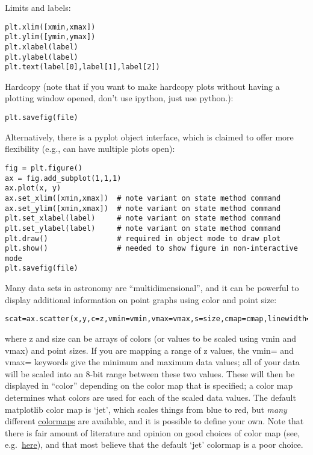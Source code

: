 \documentclass{article}
\begin{document}
Limits and labels:
\begin{verbatim}
plt.xlim([xmin,xmax])
plt.ylim([ymin,ymax])
plt.xlabel(label)
plt.ylabel(label)
plt.text(label[0],label[1],label[2])
\end{verbatim}

Hardcopy (note that if you want to make hardcopy plots without having
a plotting window opened, don't use ipython, just use python.):
\begin{verbatim}
plt.savefig(file)
\end{verbatim}
Alternatively, there is a pyplot object interface, which is claimed to
offer more flexibility (e.g., can have multiple plots open):
\begin{verbatim}
fig = plt.figure()
ax = fig.add_subplot(1,1,1)
ax.plot(x, y)
ax.set_xlim([xmin,xmax])  # note variant on state method command
ax.set_ylim([xmin,xmax])  # note variant on state method command
plt.set_xlabel(label)     # note variant on state method command
plt.set_ylabel(label)     # note variant on state method command
plt.draw()                # required in object mode to draw plot
plt.show()                # needed to show figure in non-interactive
mode
plt.savefig(file)
\end{verbatim}
Many data sets in astronomy are ``multidimensional'', and it can be
powerful to display additional information on point graphs using color
and point size:
\begin{verbatim}
scat=ax.scatter(x,y,c=z,vmin=vmin,vmax=vmax,s=size,cmap=cmap,linewidth=linewidth)
\end{verbatim}
where z and size can be arrays of colors (or values to be scaled using
vmin and vmax) and point sizes. If you are mapping a range of z
values, the vmin= and vmax= keywords give the minimum and maximum data
values; all of your data will be scaled into an 8-bit range between
these two values. These will then be displayed in ``color'' depending
on the color map that is specified; a color map determines what colors
are used for each of the scaled data values. The default matplotlib
color map is `jet', which scales things from blue to red, but
\emph{many} different \href{http://matplotlib.org/users/colormaps.html}
{colormaps} are available, and it is possible to define your
own. Note that there is fair amount of literature and opinion on good
choices of color map (see, e.g.\
\href{https://jakevdp.github.io/blog/2014/10/16/how-bad-is-your-colormap/}
{here}), and that most believe that the
default `jet' colormap is a poor choice.
\end{document}
